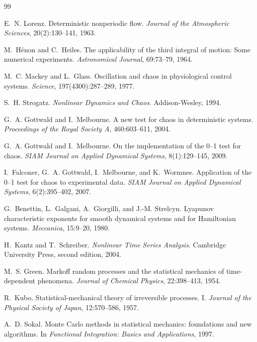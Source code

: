 \documentclass[11pt]{article}
\begin{document}
\begin{thebibliography}{99}

E.~N. Lorenz.
\newblock Deterministic nonperiodic flow.
\newblock \emph{Journal of the Atmospheric Sciences}, 20(2):130--141, 1963.

M.~H\'{e}non and C.~Heiles.
\newblock The applicability of the third integral of motion: Some numerical experiments.
\newblock \emph{Astronomical Journal}, 69:73--79, 1964.

M.~C. Mackey and L.~Glass.
\newblock Oscillation and chaos in physiological control systems.
\newblock \emph{Science}, 197(4300):287--289, 1977.

S.~H. Strogatz.
\newblock \emph{Nonlinear Dynamics and Chaos}.
\newblock Addison-Wesley, 1994.

G.~A. Gottwald and I.~Melbourne.
\newblock A new test for chaos in deterministic systems.
\newblock \emph{Proceedings of the Royal Society A}, 460:603--611, 2004.

G.~A. Gottwald and I.~Melbourne.
\newblock On the implementation of the 0--1 test for chaos.
\newblock \emph{SIAM Journal on Applied Dynamical Systems}, 8(1):129--145, 2009.

I.~Falconer, G.~A. Gottwald, I.~Melbourne, and K.~Wormnes.
\newblock Application of the 0--1 test for chaos to experimental data.
\newblock \emph{SIAM Journal on Applied Dynamical Systems}, 6(2):395--402, 2007.

G.~Benettin, L.~Galgani, A.~Giorgilli, and J.-M. Strelcyn.
\newblock Lyapunov characteristic exponents for smooth dynamical systems and for Hamiltonian systems.
\newblock \emph{Meccanica}, 15:9--20, 1980.

H.~Kantz and T.~Schreiber.
\newblock \emph{Nonlinear Time Series Analysis}.
\newblock Cambridge University Press, second edition, 2004.

M.~S. Green.
\newblock Markoff random processes and the statistical mechanics of time-dependent phenomena.
\newblock \emph{Journal of Chemical Physics}, 22:398--413, 1954.

R.~Kubo.
\newblock Statistical-mechanical theory of irreversible processes. I.
\newblock \emph{Journal of the Physical Society of Japan}, 12:570--586, 1957.

A.~D. Sokal.
\newblock Monte Carlo methods in statistical mechanics: foundations and new algorithms.
\newblock In \emph{Functional Integration: Basics and Applications}, 1997.

\end{thebibliography}
\end{document}
